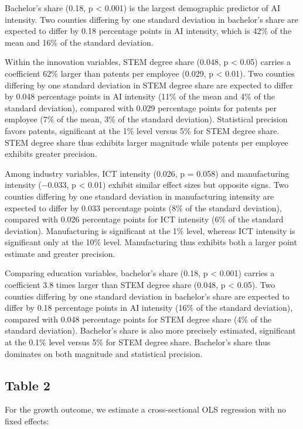 \documentclass[
]{article}
\begin{document}
Bachelor's share (0.18, p \textless{} 0.001) is the largest demographic
predictor of AI intensity. Two counties differing by one standard
deviation in bachelor's share are expected to differ by 0.18 percentage
points in AI intensity, which is 42\% of the mean and 16\% of the
standard deviation.

Within the innovation variables, STEM degree share (0.048, p \textless{}
0.05) carries a coefficient 62\% larger than patents per employee
(0.029, p \textless{} 0.01). Two counties differing by one standard
deviation in STEM degree share are expected to differ by 0.048
percentage points in AI intensity (11\% of the mean and 4\% of the
standard deviation), compared with 0.029 percentage points for patents
per employee (7\% of the mean, 3\% of the standard deviation).
Statistical precision favors patents, significant at the 1\% level
versus 5\% for STEM degree share. STEM degree share thus exhibits larger
magnitude while patents per employee exhibits greater precision.

Among industry variables, ICT intensity (0.026, p = 0.058) and
manufacturing intensity (−0.033, p \textless{} 0.01) exhibit similar
effect sizes but opposite signs. Two counties differing by one standard
deviation in manufacturing intensity are expected to differ by 0.033
percentage points (8\% of the standard deviation), compared with 0.026
percentage points for ICT intensity (6\% of the standard deviation).
Manufacturing is significant at the 1\% level, whereas ICT intensity is
significant only at the 10\% level. Manufacturing thus exhibits both a
larger point estimate and greater precision.

Comparing education variables, bachelor's share (0.18, p \textless{}
0.001) carries a coefficient 3.8 times larger than STEM degree share
(0.048, p \textless{} 0.05). Two counties differing by one standard
deviation in bachelor's share are expected to differ by 0.18 percentage
points in AI intensity (16\% of the standard deviation), compared with
0.048 percentage points for STEM degree share (4\% of the standard
deviation). Bachelor's share is also more precisely estimated,
significant at the 0.1\% level versus 5\% for STEM degree share.
Bachelor's share thus dominates on both magnitude and statistical
precision.

\subsection{Table 2}\label{table-2}

For the growth outcome, we estimate a cross-sectional OLS regression
with no fixed effects:
\end{document}
